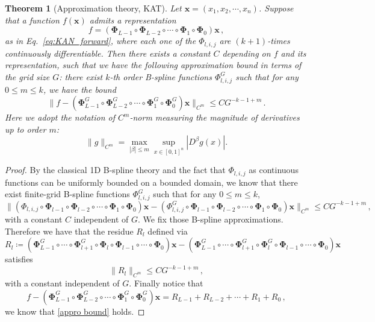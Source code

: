 \documentclass{article}
\numberwithin{equation}{section}
\numberwithin{figure}{section}
\newcommand{\mat}[1]{\mathbf{#1}}
\newtheorem{theorem}{Theorem}[section]
\begin{document}
\begin{theorem}[Approximation theory, KAT]\label{approx thm}
Let $\mat{x}=(x_1,x_2,\cdots,x_n)$.
    Suppose that a function $f(\mat{x})$ admits a representation  \begin{equation}
    f = (\mat{\Phi}_{L-1}\circ\mat{\Phi}_{L-2}\circ\cdots\circ\mat{\Phi}_{1}\circ\mat{\Phi}_{0})\mat{x}\,,
\end{equation}
 as in Eq.~\eqref{eq:KAN_forward}, where each one of the $\Phi_{l,i,j}$ are  $(k+1)$-times continuously differentiable. Then there exists a constant $C$ depending on $f$ and its representation, such that we have the following approximation bound in terms of the grid size $G$: there exist $k$-th order B-spline functions $\Phi_{l,i,j}^G$ such that for any $0\leq m\leq k$, we have the bound \begin{equation}\label{appro bound}
    \|f-(\mat{\Phi}^G_{L-1}\circ\mat{\Phi}^G_{L-2}\circ\cdots\circ\mat{\Phi}^G_{1}\circ\mat{\Phi}^G_{0})\mat{x}\|_{C^m}\leq CG^{-k-1+m}\,.
\end{equation}
Here we adopt the notation of $C^m$-norm measuring the magnitude of derivatives up to order $m$: $$
\|g\|_{C^m}=\max _{|\beta| \leq m} \sup _{x\in [0,1]^n}\left|D^\beta g(x)\right| .
$$
 
\end{theorem}
\begin{proof}
    By the classical 1D B-spline theory \cite{de1978practical} and the fact that $\Phi_{l,i,j}$ as continuous functions can be uniformly bounded on a bounded domain, we know that there exist finite-grid B-spline functions $\Phi_{l,i,j}^G$ such that for any $0\leq m\leq k$, $$\|(\Phi_{l,i,j}\circ\mat{\Phi}_{l-1}\circ\mat{\Phi}_{l-2}\circ\cdots\circ\mat{\Phi}_{1}\circ\mat{\Phi}_{0})\mat{x}-(\Phi_{l,i,j}^G\circ\mat{\Phi}_{l-1}\circ\mat{\Phi}_{l-2}\circ\cdots\circ\mat{\Phi}_{1}\circ\mat{\Phi}_{0})\mat{x}\|_{C^m}\leq CG^{-k-1+m}\,,$$
     with a  constant $C$  independent of $G$. We fix those B-spline approximations. Therefore we have  that the residue $R_l$ defined via $$R_l\coloneqq (\mat{\Phi}^G_{L-1}\circ\cdots\circ\mat{\Phi}^G_{l+1}\circ\mat{\Phi}_{l}\circ\mat{\Phi}_{l-1}\circ\cdots\circ\mat{\Phi}_{0})\mat{x}-(\mat{\Phi}_{L-1}^G\circ\cdots\circ\mat{\Phi}_{l+1}^G\circ\mat{\Phi}_{l}^G\circ\mat{\Phi}_{l-1}\circ\cdots\circ\mat{\Phi}_{0})\mat{x}$$
satisfies $$\|R_l\|_{C^m}\leq CG^{-k-1+m}\,,$$
with a constant independent of $G$. Finally notice that $$f-(\mat{\Phi}^G_{L-1}\circ\mat{\Phi}^G_{L-2}\circ\cdots\circ\mat{\Phi}^G_{1}\circ\mat{\Phi}^G_{0})\mat{x}=R_{L-1}+R_{L-2}+\cdots+R_1+R_0\,,$$
we know that \eqref{appro bound} holds.
\end{proof}
\end{document}
